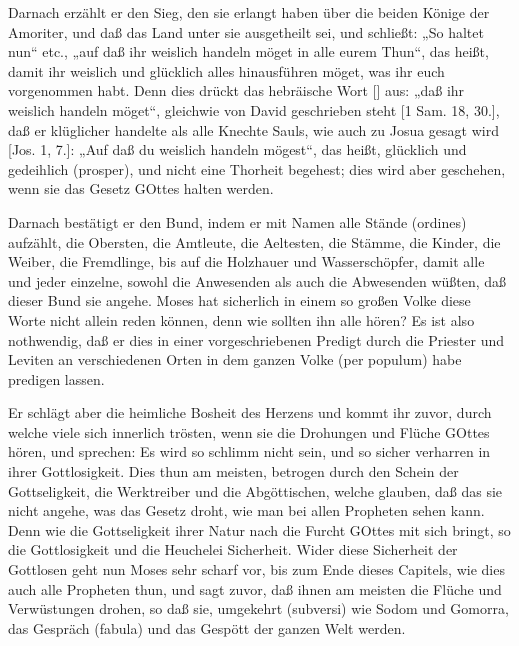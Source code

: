 Darnach erzählt er den Sieg, den sie erlangt haben über die beiden Könige der Amoriter, und daß das Land unter sie ausgetheilt sei, und schließt: „So haltet nun“ etc., „auf daß ihr weislich handeln möget in alle eurem Thun“, das heißt, damit ihr weislich und glücklich alles hinausführen möget, was ihr euch vorgenommen habt. Denn dies drückt das hebräische Wort [] aus: „daß ihr weislich handeln möget“, gleichwie von David geschrieben steht [1 Sam. 18, 30.], daß er klüglicher handelte als alle Knechte Sauls, wie auch zu Josua gesagt wird [Jos. 1, 7.]: „Auf daß du weislich handeln mögest“, das heißt, glücklich und gedeihlich (prosper), und nicht eine Thorheit begehest; dies wird aber geschehen, wenn sie das Gesetz GOttes halten werden.

Darnach bestätigt er den Bund, indem er mit Namen alle Stände (ordines) aufzählt, die Obersten, die Amtleute, die Aeltesten, die Stämme, die Kinder, die Weiber, die Fremdlinge, bis auf die Holzhauer und Wasserschöpfer, damit alle und jeder einzelne, sowohl die Anwesenden als auch die Abwesenden wüßten, daß dieser Bund sie angehe. Moses hat sicherlich in einem so großen Volke diese Worte nicht allein reden können, denn wie sollten ihn alle hören? Es ist also nothwendig, daß er dies in einer vorgeschriebenen Predigt durch die Priester und Leviten an verschiedenen Orten in dem ganzen Volke (per populum) habe predigen lassen.

Er schlägt aber die heimliche Bosheit des Herzens und kommt ihr zuvor, durch welche viele sich innerlich trösten, wenn sie die Drohungen und Flüche GOttes hören, und sprechen: Es wird so schlimm nicht sein, und so sicher verharren in ihrer Gottlosigkeit. Dies thun am meisten, betrogen durch den Schein der Gottseligkeit, die Werktreiber und die Abgöttischen, welche glauben, daß das sie nicht angehe, was das Gesetz droht, wie man bei allen Propheten sehen kann. Denn wie die Gottseligkeit ihrer Natur nach die Furcht GOttes mit sich bringt, so die Gottlosigkeit und die Heuchelei Sicherheit. Wider diese Sicherheit der Gottlosen geht nun Moses sehr scharf vor, bis zum Ende dieses Capitels, wie dies auch alle Propheten thun, und sagt zuvor, daß ihnen am meisten die Flüche und Verwüstungen drohen, so daß sie, umgekehrt (subversi) wie Sodom und Gomorra, das Gespräch (fabula) und das Gespött der ganzen Welt werden.


